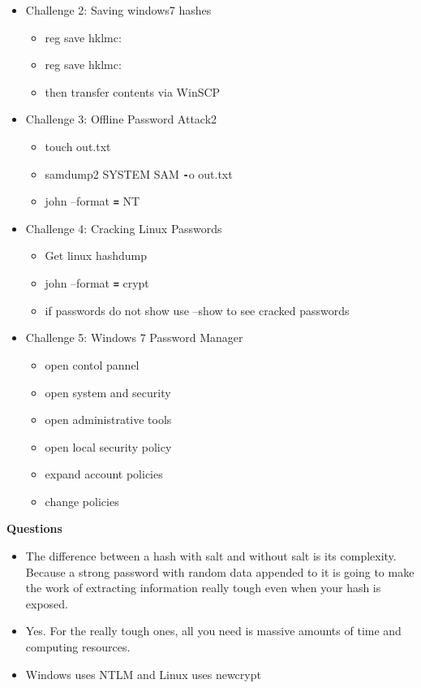 \documentclass[12pt]{article}
\newcommand{\code}[1]{\texttt{\bfseries#1}}
\begin{document}
\begin{itemize}
\begin{itemize}
		\end{itemize}
	\item Challenge 2: Saving windows7 hashes
		\begin{itemize}
			\item reg save hklm\sam c:\sam
			\item reg save hklm\system c:\system
            \item then transfer contents via WinSCP
		\end{itemize}
	\item Challenge 3: Offline Password Attack2
		\begin{itemize}
            \item touch out.txt
			\item samdump2 SYSTEM SAM \code-o out.txt
			\item john --format \code= NT 
		\end{itemize}
    \item Challenge 4: Cracking Linux Passwords
        \begin{itemize}
            \item Get linux hashdump
            \item john --format \code= crypt
            \item if passwords do not show use --show to see cracked passwords
        \end{itemize}
     \item Challenge 5: Windows 7 Password Manager
        \begin{itemize}
            \item open contol pannel
            \item open system and security
            \item open administrative tools
            \item open local security policy
            \item expand account policies
            \item change policies
        \end{itemize}
 
\end{itemize}

\textbf{Questions}

\begin{itemize}

	\item The difference between a hash with salt and without salt is its complexity. Because a strong password with random data appended to it is going to make the work of extracting information really tough even when your hash is exposed.
	\item Yes. For the really tough ones, all you need is massive amounts of time and computing resources.
    \item Windows uses NTLM and Linux uses newcrypt
\end{itemize}	
\end{document}
